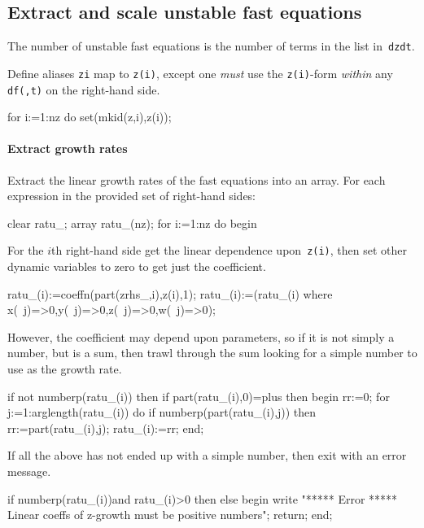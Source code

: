 \documentclass[11pt,a5paper]{article}
\begin{document}
\subsection{Extract and scale unstable fast equations}

The number of unstable fast equations is the number of terms
in the list in~\verb|dzdt|.
Define aliases \verb|zi| map to \verb|z(i)|, except one 
\emph{must} use the \verb|z(i)|-form \emph{within} any 
\verb|df(,t)| on the right-hand side.
\begin{reduce}
for i:=1:nz do set(mkid(z,i),z(i));
\end{reduce}

\paragraph{Extract growth rates}
Extract the linear growth rates of the fast equations into
an array. For each expression in the provided set of
right-hand sides:
\begin{reduce}
clear ratu_; array ratu_(nz);
for i:=1:nz do begin
\end{reduce}

For the $i$th right-hand side get the linear dependence
upon~\verb|z(i)|, then set other dynamic variables to zero
to get just the coefficient.
\begin{reduce}
  ratu_(i):=coeffn(part(zrhs_,i),z(i),1);
  ratu_(i):=(ratu_(i) where 
      {x(~j)=>0,y(~j)=>0,z(~j)=>0,w(~j)=>0});
\end{reduce}

However, the coefficient may depend upon parameters, so if
it is not simply a number, but is a sum, then trawl through
the sum looking for a simple number to use as the growth
rate.
\begin{reduce}
  if not numberp(ratu_(i)) then 
  if part(ratu_(i),0)=plus then begin
    rr:=0;
    for j:=1:arglength(ratu_(i)) do 
      if numberp(part(ratu_(i),j)) 
      then rr:=part(ratu_(i),j);
    ratu_(i):=rr;
  end;
\end{reduce}

If all the above has not ended up with a simple number, then
exit with an error message. 
\begin{reduce}
  if numberp(ratu_(i))and ratu_(i)>0 then
  else begin 
    write "***** Error *****
    Linear coeffs of z-growth must be positive numbers";
    return;
  end;
\end{reduce}
\end{document}
